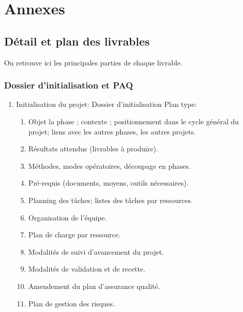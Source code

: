 \vfil
\pagebreak
\section{Annexes}


\subsection{Détail et plan des livrables}
On retrouve ici les principales parties de chaque livrable.

\subsubsection{Dossier d'initialisation et PAQ}
		\begin{enumerate}
			\item Initialisation du projet:
				Dossier d'initialisation
					Plan type:
						\begin{enumerate}
							\item Objet la phase ; contexte ; positionnement
                                dans le cycle général du projet; liens avec
                                les autres phases, les autres projets.
							\item Résultats attendus (livrables à produire).
							\item Méthodes, modes opératoires, découpage en 
                                    phases.
							\item Pré-requis (documents, moyens, outils
                                    nécessaires).
							\item Planning des tâches; listes des tâches par
                                    ressources.
							\item Organisation de l'équipe.
							\item Plan de charge par ressource.
							\item Modalités de suivi d'avancement du projet.
							\item Modalités de validation et de recette.
							\item Amendement du plan d'assurance qualité.
							\item Plan de gestion des risques.
						\end{enumerate}
		\end{enumerate}
